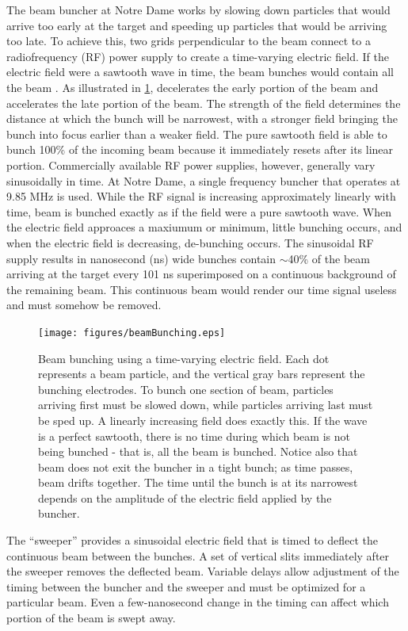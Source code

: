 The beam buncher at Notre Dame works by slowing down particles that would arrive too early at the target and speeding up particles that would be arriving too late.  To achieve this, two grids perpendicular to the beam connect to a radiofrequency (RF) power supply to create a time-varying electric field.  If the electric field were a sawtooth wave in time, the beam bunches would contain all the beam \cite{LynchBunching}.  As illustrated in \ref{fig:bunching}, decelerates the early portion of the beam and accelerates the late portion of the beam.  The strength of the field determines the distance at which the bunch will be narrowest, with a stronger field bringing the bunch into focus earlier than a weaker field.  The pure sawtooth field is able to bunch 100\% of the incoming beam because it immediately resets after its linear portion.  Commercially available RF power supplies, however, generally vary sinusoidally in time.  At Notre Dame, a single frequency buncher that operates at 9.85 MHz is used.  While the RF signal is increasing approximately linearly with time, beam is bunched exactly as if the field were a pure sawtooth wave.  When the electric field approaces a maxiumum or minimum, little bunching occurs, and when the electric field is decreasing, de-bunching occurs.  The sinusoidal RF supply results in nanosecond (ns) wide bunches contain $\sim$40\% of the beam arriving at the target every 101 ns superimposed on a continuous background of the remaining beam.  This continuous beam would render our time signal useless and must somehow be removed.

\begin{figure}[htp]
\centering
\texttt{[image: figures/beamBunching.eps]}
\label{fig:bunching}
\caption{Beam bunching using a time-varying electric field.  Each dot represents a beam particle, and the vertical gray bars represent the bunching electrodes.  To bunch one section of beam, particles arriving first must be slowed down, while particles arriving last must be sped up.  A linearly increasing field does exactly this.  If the wave is a perfect sawtooth, there is no time during which beam is not being bunched - that is, all the beam is bunched.  Notice also that beam does not exit the buncher in a tight bunch; as time passes, beam drifts together.  The time until the bunch is at its narrowest depends on the amplitude of the electric field applied by the buncher.}
\end{figure}

The ``sweeper'' provides a sinusoidal electric field that is timed to deflect the continuous beam between the bunches.  A set of vertical slits immediately after the sweeper removes the deflected beam.  Variable delays allow adjustment of the timing between the buncher and the sweeper and must be optimized for a particular beam.  Even a few-nanosecond change in the timing can affect which portion of the beam is swept away. 

